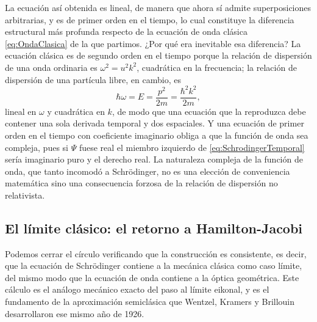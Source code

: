         La ecuación así obtenida es lineal, de manera que ahora sí admite superposiciones arbitrarias, y es de primer orden en el tiempo, lo cual constituye la diferencia estructural más profunda respecto de la ecuación de onda clásica \eqref{eq:OndaClasica} de la que partimos. ¿Por qué era inevitable esa diferencia? La ecuación clásica es de segundo orden en el tiempo porque la relación de dispersión de una onda ordinaria es $\omega^{2} = u^{2}k^{2}$, cuadrática en la frecuencia; la relación de dispersión de una partícula libre, en cambio, es
        \begin{equation}\label{eq:DispersionSchrodinger}
            \hbar\omega = E = \frac{p^{2}}{2m} = \frac{\hbar^{2}k^{2}}{2m},
        \end{equation}
        lineal en $\omega$ y cuadrática en $k$, de modo que una ecuación que la reproduzca debe contener una sola derivada temporal y dos espaciales. Y una ecuación de primer orden en el tiempo con coeficiente imaginario obliga a que la función de onda sea compleja, pues si $\Psi$ fuese real el miembro izquierdo de \eqref{eq:SchrodingerTemporal} sería imaginario puro y el derecho real. La naturaleza compleja de la función de onda, que tanto incomodó a Schrödinger, no es una elección de conveniencia matemática sino una consecuencia forzosa de la relación de dispersión no relativista.

    \subsection{El límite clásico: el retorno a Hamilton-Jacobi}

        Podemos cerrar el círculo verificando que la construcción es consistente, es decir, que la ecuación de Schrödinger contiene a la mecánica clásica como caso límite, del mismo modo que la ecuación de onda contiene a la óptica geométrica. Este cálculo es el análogo mecánico exacto del paso al límite eikonal, y es el fundamento de la aproximación semiclásica que Wentzel, Kramers y Brillouin desarrollaron ese mismo año de 1926.

